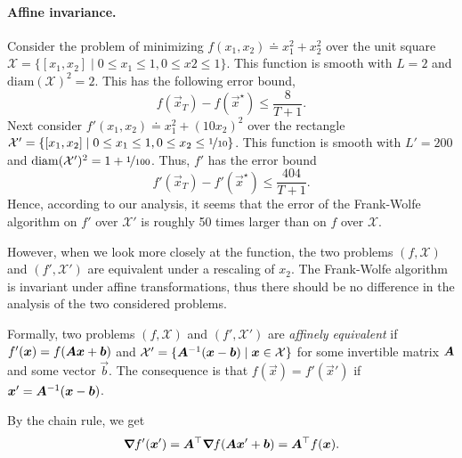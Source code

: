 \paragraph{Affine invariance.}

Consider the problem of minimizing $f(x_1, x_2) \doteq x_1^2 + x_2^2$ over the unit square
$\mathcal{X} = \{ [x_1,x_2] \mid 0 \leq x_1 \leq 1, 0 \leq x2 \leq 1 \}$. This function is smooth
with $L=2$ and $\mathrm{diam}(\mathcal{X})^2 = 2$. This has the following error bound, \[
    f(\vec{x}_T) - f(\vec{x}^\star) \leq \frac{8}{T+1}.
\]
Next consider $f'(x_1, x_2) \doteq x_1^2 + (10x_2)^2$ over the rectangle $\mathcal{X}' = \{ [x_1,
            x_2] \mid 0 \leq x_1 \leq 1, 0\leq x_2 \leq \nicefrac{1}{10} \}$. This function is smooth with $L'
    = 200$ and $\mathrm{diam}(\mathcal{X}')^2 = 1 + \nicefrac{1}{100}$. Thus, $f'$ has the error bound \[
    f'(\vec{x}_T) - f'(\vec{x}^\star) \leq \frac{404}{T+1}.
\]
Hence, according to our analysis, it seems that the error of the Frank-Wolfe algorithm on $f'$ over
$\mathcal{X}'$ is roughly 50 times larger than on $f$ over $\mathcal{X}$.

However, when we look more closely at the function, the two problems $(f,\mathcal{X})$ and
$(f',\mathcal{X}')$ are equivalent under a rescaling of $x_2$. The Frank-Wolfe algorithm is
invariant under affine transformations, thus there should be no difference in the analysis of the
two considered problems.

Formally, two problems $(f, \mathcal{X})$ and $(f', \mathcal{X}')$ are \textit{affinely equivalent}
if $f'(\bm{x}) = f(\bm{A} \bm{x} + \bm{b})$ and $\mathcal{X}' = \{ \bm{A}^{-1}(\bm{x} -
    \bm{b}) \mid \bm{x} \in \mathcal{X} \}$ for some invertible matrix $\bm{A}$ and some vector
$\vec{b}$. The consequence is that $f(\vec{x}) = f'(\vec{x}')$ if $\bm{x}' = \bm{A}^{-1}
    (\bm{x} - \bm{b})$.

By the chain rule, we get \[
    \bm{\nabla}_{\! } f'(\bm{x}') = \bm{A}^\top \bm{\nabla}_{\! } f(\bm{A} \bm{x}' + \bm{b}) = \bm{A}^\top f(\bm{x}).
\]

